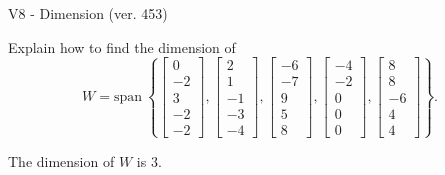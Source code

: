 \begin{exercise}
  \begin{exerciseTitle}V8 - Dimension (ver. 453)\end{exerciseTitle}
  \begin{exerciseStatement}
    Explain how to find the dimension of 
\[W=\mathrm{span}\ \left\{\left[\begin{array}{r}
0 \\
-2 \\
3 \\
-2 \\
-2
\end{array}\right] , \left[\begin{array}{r}
2 \\
1 \\
-1 \\
-3 \\
-4
\end{array}\right] , \left[\begin{array}{r}
-6 \\
-7 \\
9 \\
5 \\
8
\end{array}\right] , \left[\begin{array}{r}
-4 \\
-2 \\
0 \\
0 \\
0
\end{array}\right] , \left[\begin{array}{r}
8 \\
8 \\
-6 \\
4 \\
4
\end{array}\right]\right\}.\]



  \end{exerciseStatement}
  \begin{exerciseAnswer}
   The dimension of \(W\) is  \(3\).
  


  \end{exerciseAnswer}
\end{exercise}